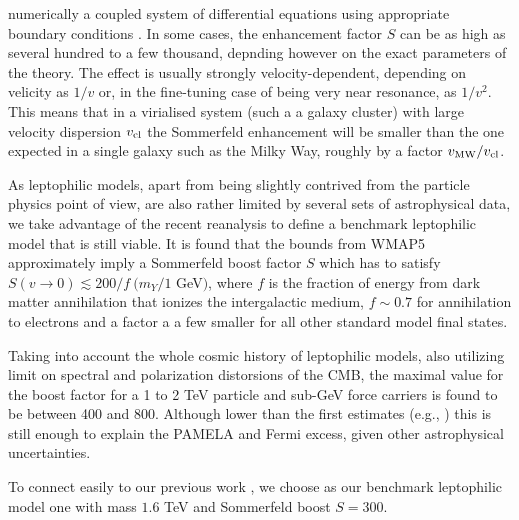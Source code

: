 \documentclass[10pt,aps,pra,reprint,amsmath,amsfonts,amssymb,showpacs]{revtex4-1}
\begin{document}
numerically a coupled system of differential equations using
appropriate boundary conditions
\cite{2005PhRvD..71f3528H,2007NuPhB.787..152C,2009PhRvD..79a5014A}. In
some cases, the enhancement factor $S$ can be as high as several
hundred to a few thousand, depnding however on the exact parameters of
the theory. The effect is usually strongly velocity-dependent,
depending on velicity as $1/v$ or, in the fine-tuning case of being
very near resonance, as $1/v^2$. This means that in a virialised
system (such a a galaxy cluster) with large velocity dispersion
$v_{\rm cl}$ the Sommerfeld enhancement will be smaller than the one
expected in a single galaxy such as the Milky Way, roughly by a factor
$v_{\rm MW}/v_{\rm cl}$.


As leptophilic models, apart from being slightly contrived from the
particle physics point of view, are also rather limited by several
sets of astrophysical data, we take advantage of the recent reanalysis
\cite{Finkbeiner:2010sm} to define a benchmark leptophilic model that
is still viable.  It is found that the bounds from WMAP5 approximately
imply a Sommerfeld boost factor $S$ which has to satisfy $S(v\to
0)\lesssim 200/f\ (m_Y/1$ GeV$)$, where $f$ is the fraction of energy
from dark matter annihilation that ionizes the intergalactic medium,
$f\sim 0.7$ for annihilation to electrons and a factor a a few smaller
for all other standard model final states.

Taking into account the whole cosmic history of leptophilic models,
also utilizing limit on spectral and polarization distorsions of the
CMB, the maximal value for the boost factor for a 1 to 2 TeV particle
and sub-GeV force carriers is found to be \cite{Finkbeiner:2010sm}
between 400 and 800. Although lower than the first estimates (e.g.,
\cite{Bergstrom:2009fa,Meade:2009iu}) this is still enough to explain
the PAMELA and Fermi excess, given other astrophysical uncertainties.

To connect easily to our previous work \cite{2009PhRvL.103r1302P}, we
choose as our benchmark leptophilic model one with mass $1.6$ TeV and
Sommerfeld boost $S=300$.
\end{document}
